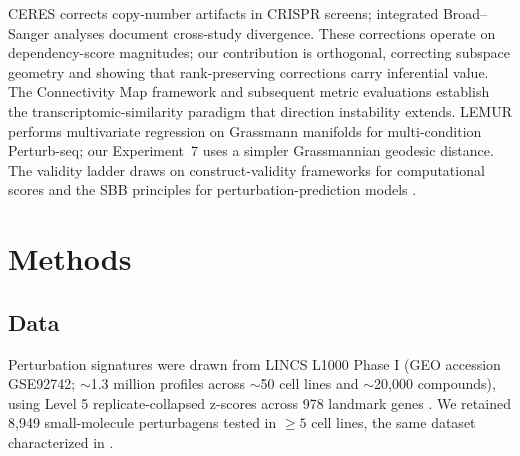 \documentclass{article}
\begin{document}
CERES \citep{meyers2017ceres} corrects copy-number artifacts in CRISPR
screens; integrated Broad--Sanger analyses \citep{pacini2021integrated}
document cross-study divergence. These corrections operate on
dependency-score magnitudes; our contribution is orthogonal, correcting
subspace geometry and showing that rank-preserving corrections carry
inferential value. The Connectivity Map framework
\citep{subramanian2017next,lamb2006connectivity} and subsequent metric
evaluations \citep{li2020comprehensive} establish the
transcriptomic-similarity paradigm that direction instability extends.
LEMUR \citep{ahlmanneltze2025lemur} performs multivariate regression on
Grassmann manifolds for multi-condition Perturb-seq; our Experiment~7 uses
a simpler Grassmannian geodesic distance. The validity ladder draws on
construct-validity frameworks for computational scores
\citep{freiesleben2025benchmarking,watson2025measuring} and the SBB
principles for perturbation-prediction models \citep{sbb2026principles}.

\section{Methods}

\subsection{Data}

Perturbation signatures were drawn from LINCS L1000 Phase I (GEO accession
GSE92742; $\sim$1.3 million profiles across $\sim$50 cell lines and
$\sim$20{,}000 compounds), using Level 5 replicate-collapsed z-scores
across 978 landmark genes \citep{subramanian2017next}. We retained 8{,}949
small-molecule perturbagens tested in $\geq5$ cell lines, the same dataset
characterized in \citet{tower2026bracket}.
\end{document}
